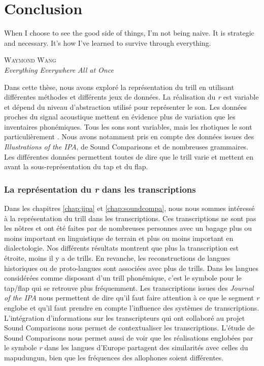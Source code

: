 \chapter*{Conclusion}

\setlength{\epigraphwidth}{0.6\textwidth}
\epigraph{When I choose to see the good side of things, I'm not being naive. It is strategic and necessary. It's how I've learned to survive through everything.}{\textsc{Waymond Wang}\\\textit{Everything Everywhere All at Once}}
\vspace{1.5cm}

Dans cette thèse, nous avons exploré la représentation du trill en utilisant différentes méthodes et différents jeux de données. La réalisation du \textit{r} est variable et dépend du niveau d'abstraction utilisé pour représenter le son. Les données proches du signal acoustique mettent en évidence plus de variation que les inventaires phonémiques. Tous les sons sont variables, mais les rhotiques le sont particulièrement \parencite{scobbieVariable2006}.
Nous avons notamment pris en compte des données issues des \textit{Illustrations of the IPA}, de Sound Comparisons et de nombreuses grammaires. Les différentes données permettent toutes de dire que le trill varie et mettent en avant la sous-représentation du tap et du flap.

\subsection*{La représentation du \textit{r} dans les transcriptions}

Dans les chapitres \ref{chap:jipa} et \ref{chap:soundcompa}, nous nous sommes intéressé à la représentation du trill dans les transcriptions. Ces transcriptions ne sont pas les nôtres et ont été faites par de nombreuses personnes avec un bagage plus ou moins important en linguistique de terrain et plus ou moins important en dialectologie.
Nos différents résultats montrent que plus la transcription est étroite, moins il y a de trills.
En revanche, les reconstructions de langues historiques ou de proto-langues sont associées avec plus de trills. Dans les langues considérées comme disposant d'un trill phonémique, c'est le symbole pour le tap/flap qui se retrouve plus fréquemment. Les transcriptions issues des \textit{Journal of the IPA} nous permettent de dire qu'il faut faire attention à ce que le segment \textit{r} englobe et qu'il faut prendre en compte l'influence des systèmes de transcriptions. L'intégration d'informations sur les transcripteurs qui ont collaboré au projet Sound Comparisons nous permet de contextualiser les transcriptions. L'étude de Sound Comparisons nous permet aussi de voir que les réalisations englobées par le symbole \textit{r} dans les langues d'Europe partagent des similarités avec celles du mapudungun, bien que les fréquences des allophones soient différentes.\\

